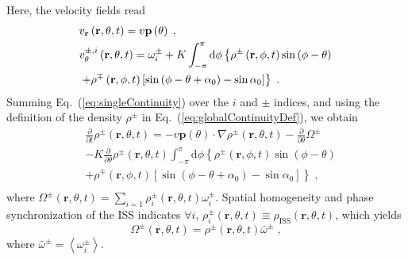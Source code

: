\documentclass{article}
\begin{document}
Here, the velocity fields read
\begin{subequations}
    \begin{align}
        &v_{\mathbf{r}}\left( \mathbf{r},\theta ,t \right) =v\mathbf{p}\left( \theta \right) \;,\\
        &v_{\theta}^{\pm ,i}\left( \mathbf{r},\theta ,t \right) =\omega _{i}^{\pm}+K\int_{-\pi}^{\pi}{\mathrm{d}\phi \left\{ \rho ^{\pm}\left( \mathbf{r},\phi ,t \right) \sin \left( \phi -\theta \right) \right.}\notag\\
        &\left. +\rho ^{\mp}\left( \mathbf{r},\phi ,t \right) \left[ \sin \left( \phi -\theta +\alpha _0 \right) -\sin \alpha _0 \right] \right\} \;.
    \end{align}
\end{subequations}
Summing Eq.~(\ref{eq:singleContinuity}) over the $i$ and $\pm$ indices, and using the definition of the density $\rho ^\pm$ in Eq.~(\ref{eq:globalContinuityDef}), we obtain  
\begin{equation}
    \label{eq:globalContinuity}
    \begin{aligned}
        &\frac{\partial}{\partial t}\rho ^{\pm}\left( \mathbf{r},\theta ,t \right) =-v\mathbf{p}\left( \theta \right) \cdot \nabla \rho ^{\pm}\left( \mathbf{r},\theta ,t \right) -\frac{\partial}{\partial \theta}\Omega^{\pm}\\
        &-K\frac{\partial}{\partial \theta}\rho ^{\pm}\left( \mathbf{r},\theta ,t \right) \int_{-\pi}^{\pi}{\mathrm{d}\phi}\left\{ \rho ^{\pm}\left( \mathbf{r},\phi ,t \right) \sin \left( \phi -\theta \right) \right.\\
        &\left. +\rho ^{\mp}\left( \mathbf{r},\phi ,t \right) \left[ \sin \left( \phi -\theta +\alpha _0 \right) -\sin \alpha _0 \right] \right\} \;,\\
    \end{aligned}
\end{equation}
where $\Omega^{\pm} \left( \mathbf{r},\theta ,t \right) =\sum_{i=1}{\rho _{i}^{\pm}\left( \mathbf{r},\theta ,t \right) \omega _{i}^{\pm}}$.
Spatial homogeneity and phase synchronization of the ISS indicates
 $\forall i$, $\rho _{i}^{\pm}\left( \mathbf{r},\theta ,t \right) \equiv \rho _{\text{ISS}}\left( \mathbf{r},\theta ,t \right)$, which yields
\begin{equation}
    \Omega ^{\pm}\left( \mathbf{r},\theta ,t \right) =\rho ^{\pm}\left( \mathbf{r},\theta ,t \right) \bar{\omega}^{\pm}\;,
\end{equation} 
where $\bar{\omega}^{\pm}=\left< \omega _{i}^{\pm} \right>$.
\end{document}
